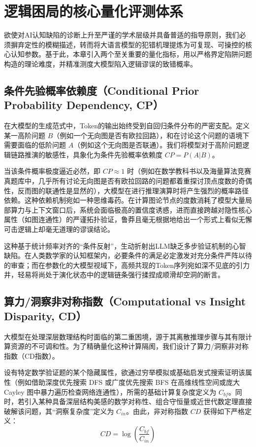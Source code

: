 \documentclass[12pt, a4paper]{report}
\begin{document}
\section{逻辑困局的核心量化评测体系}

欲使对AI认知缺陷的诊断上升至严谨的学术层级并具备普适的指导原则，我们必须摒弃定性的模糊描述，转而将大语言模型的犯错机理提炼为可复现、可操控的核心认知参数。基于此，本章引入两个至关重要的量化指标，用以严格界定陷阱问题构造的理论难度，并精准测度大模型陷入逻辑谬误的致错概率。

\subsection{条件先验概率依赖度（Conditional Prior Probability Dependency, CP）}

在大模型的生成范式中，Token的输出始终受到自回归条件分布的严密支配。定义某一高阶问题 $B$（例如一个无向图是否有欧拉回路），和在讨论这个问题的语境下需要面临的低阶问题 $A$（例如这个无向图是否联通）。我们将模型对于高阶问题逻辑链路推演的敏感性，具象化为条件先验概率依赖度 $CP= P(A|B)$。

当该条件概率极度逼近必然，即 $CP \approx 1$ 时（例如在数学教科书以及海量算法竞赛真题库中，几乎所有讨论无向图是否有欧拉回路的问题都着重探讨顶点度数的奇偶性，反而图的联通性是显然的），大模型在进行推理演算时将产生强烈的概率路径依赖。这种依赖机制宛如一种思维毒药。在计算图论节点的度数消耗了模型大量局部算力与上下文窗口后，系统会面临极高的置信度诱惑，进而直接跨越对隐性核心属性（如图连通性）的严谨拓扑验证，鲁莽且毫无根据地给出一个形式上看似无懈可击逻辑上却毫无道理的谬误结论。

这种基于统计频率对齐的“条件反射”，生动折射出LLM缺乏多步验证机制的心智缺陷。在人类数学家的认知框架内，必要条件的满足必定激发对充分条件严阵以待的审查；而在参数化的大模型视域下，高频共现的Token序列宛如深不见底的引力井，轻易将尚处于演化状态中的逻辑链条强行揉捏成顺滑却空洞的断言。

\subsection{算力/洞察非对称指数（Computational vs Insight Disparity, CD）}

大模型在处理深层数理结构时面临的第二重困境，源于其离散推理步骤与其有限计算资源的不可调和性。为了精确量化这种计算隔阂，我们设计了算力/洞察非对称指数（CD指数）。

设有特定数学验证题的某个隐藏属性，欲通过穷举模拟或基础启发式搜索证明该属性（例如借助深度优先搜索 DFS 或广度优先搜索 BFS 在高维线性空间或庞大 Cayley 图中暴力遍历检查网络连通性），所需的基础计算复杂度定义为 $C_{bf}$。同时，若引入某种具备深层结构美感的数学对称性、组合守恒量或近世代数定理直接破解该问题，其“洞察复杂度”定义为 $C_{in}$。由此，非对称指数 $CD$ 获得如下严格定义：
\begin{equation}
CD = \log \left( \frac{C_{bf}}{C_{in}} \right)
\end{equation}
\end{document}
